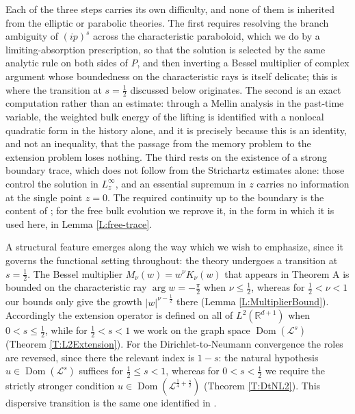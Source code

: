 \documentclass[11pt,letter]{amsart}
\def \RNu {\mathbb{R}^{d+1}}
\numberwithin{equation}{section}
\newcommand{\Le}{\mathcal L}
\newcommand{\Dom}{\operatorname{Dom}}
\numberwithin{equation}{section}
\begin{document}
Each of the three steps carries its own difficulty, and none of them is
inherited from the elliptic or parabolic theories. The first requires resolving
the branch ambiguity of $(ip)^s$ across the characteristic paraboloid, which we
do by a limiting-absorption prescription, so that the solution is selected by the
same analytic rule on both sides of $P$, and then inverting a Bessel multiplier of complex argument
whose boundedness on the characteristic rays is itself delicate; this is where
the transition at $s=\frac12$ discussed below originates. The second is an exact
computation rather than an estimate: through a Mellin analysis in the past-time
variable, the weighted bulk energy of the lifting is identified with a nonlocal
quadratic form in the history alone, and it is precisely because this is an
identity, and not an inequality, that the passage from the memory problem to the
extension problem loses nothing. The third rests on the existence of a strong
boundary trace, which does not follow from the Strichartz estimates alone:
those control the solution in $L^\infty_z$, and an essential
supremum in $z$ carries no information at the single point $z=0$. The required
continuity up to the boundary is the content of \cite[Theorems~8.1
and~8.2]{GS2}; for the free bulk evolution we reprove it, in the form in which
it is used here, in Lemma \ref{L:free-trace}.

A structural feature emerges along the way which we wish to emphasize, since it
governs the functional setting throughout: the theory undergoes a transition at
$s=\frac12$. The Bessel multiplier $M_\nu(w)=w^\nu K_\nu(w)$ that appears in
Theorem A is bounded on the characteristic ray $\arg w=-\frac\pi2$ when
$\nu\le\frac12$, whereas for $\frac12<\nu<1$ our bounds only give the growth
$|w|^{\nu-\frac12}$ there (Lemma \ref{L:MultiplierBound}). Accordingly the
extension operator is defined on all of $L^2(\RNu)$ when $0<s\le\frac12$, while
for $\frac12<s<1$ we work on the graph space $\Dom(\Le^s)$
(Theorem \ref{T:L2Extension}). For the Dirichlet-to-Neumann convergence the
roles are reversed, since there the relevant index is $1-s$: the natural
hypothesis $u\in\Dom(\Le^s)$ suffices for $\frac12\le s<1$, whereas for
$0<s<\frac12$ we require the strictly stronger condition
$u\in\Dom(\Le^{\frac14+\frac s2})$ (Theorem \ref{T:DtNL2}). This dispersive
transition is the same one identified in \cite{GS1,GS2}.
\end{document}
